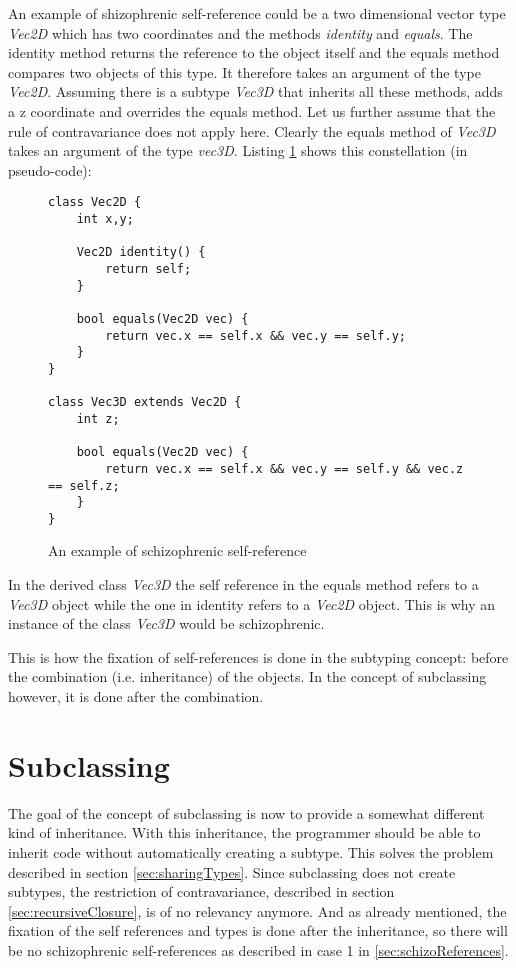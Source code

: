 An example of shizophrenic self-reference could be a two dimensional
vector type \emph{Vec2D} which has two coordinates and the methods
\emph{identity} and \emph{equals}. The identity method returns the
reference to the object itself and the equals method compares two
objects of this type. It therefore takes an argument of the type
\emph{Vec2D}. Assuming there is a subtype \emph{Vec3D} that inherits
all these methods, adds a z coordinate and overrides the equals
method. Let us further assume that the rule of contravariance does not
apply here. Clearly the equals method of \emph{Vec3D} takes an argument
of the type \emph{vec3D}. Listing \ref{fig:schizoListing} shows this
constellation (in pseudo-code):

\begin{figure}[H]
\begin{lstlisting}
class Vec2D {
	int x,y;

	Vec2D identity() {
		return self;
	}

	bool equals(Vec2D vec) {
		return vec.x == self.x && vec.y == self.y;
	}
}

class Vec3D extends Vec2D {
	int z;

	bool equals(Vec2D vec) {
		return vec.x == self.x && vec.y == self.y && vec.z == self.z;
	}
}
\end{lstlisting}
\caption{An example of schizophrenic self-reference}
\label{fig:schizoListing}
\end{figure}

In the derived class \emph{Vec3D} the self reference in the equals 
method refers to a \emph{Vec3D} object while the one in identity
refers to a \emph{Vec2D} object. This is why an instance of the class
\emph{Vec3D} would be schizophrenic.

This is how the fixation of self-references is done in the subtyping
concept: before the combination (i.e. inheritance) of the objects. In the
concept of subclassing however, it is done after the combination.

\section{Subclassing}

The goal of the concept of subclassing is now to provide a somewhat
different kind of inheritance. With this inheritance, the programmer should
be able to inherit code without automatically creating a subtype. 
This solves the problem described in section \ref{sec:sharingTypes}. Since
subclassing does not create subtypes, the restriction of contravariance, 
described in section \ref{sec:recursiveClosure}, is of no relevancy
anymore. And as already mentioned, the fixation of the self
references and types is done after the inheritance, so there will be no
schizophrenic self-references as described in case 1 in 
\ref{sec:schizoReferences}. \\

